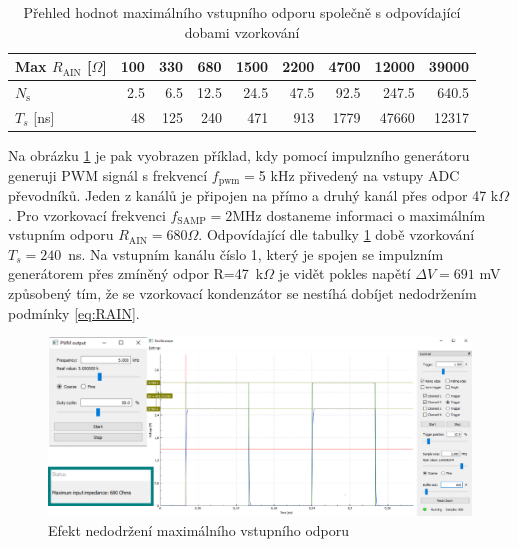 \begin{table}[H]
	\begin{tabular}{lrrrrrrrr}
		Max $R_{\text{AIN}}$ [$\Omega$]       & \multicolumn{1}{c}{100} & \multicolumn{1}{c}{330} & \multicolumn{1}{c}{680} & \multicolumn{1}{c}{1500} & \multicolumn{1}{c}{2200} & \multicolumn{1}{c}{4700} & \multicolumn{1}{c}{12000} & \multicolumn{1}{c}{39000} \\ \hline
		$N_{\text{s}}$ & 2.5                     & 6.5                     & 12.5                    & 24.5                     & 47.5                     & 92.5                     & 247.5                     & 640.5                     \\
		$T_s$ {[}ns{]}    & 48                      & 125                     & 240                     & 471                      & 913                      & 1779                     & 47660                     & 12317                    
	\end{tabular}
	\caption{Přehled hodnot maximálního vstupního odporu společně s odpovídající dobami vzorkování}
	\label{tab:maxRAIN}
\end{table}

 Na obrázku \ref{fig:wrongmaxrain} je pak vyobrazen příklad, kdy pomocí impulzního generátoru generuji PWM signál s frekvencí $f_{\text{pwm}}=$5 kHz přivedený na vstupy ADC převodníků. Jeden z kanálů je připojen na přímo a druhý kanál přes odpor 47 k$\Omega$. Pro vzorkovací frekvenci $f_{\text{SAMP}}=2$MHz dostaneme informaci o maximálním vstupním odporu $R_{\text{AIN}}=680\Omega$. Odpovídající dle tabulky \ref{tab:maxRAIN} době vzorkování $T_s=240$~ns. Na vstupním kanálu číslo 1, který je spojen se impulzním generátorem přes zmíněný odpor R=47~k$\Omega$ je vidět pokles napětí $\Delta V=691$ mV způsobený tím, že se vzorkovací kondenzátor se nestíhá dobíjet nedodržením podmínky \ref{eq:RAIN}.


\begin{figure}[H]
	\centering
	\includegraphics[width=0.9\linewidth]{Figs/Screenshots/RAINpwmgraph.pdf}
	\caption{Efekt nedodržení maximálního vstupního odporu}
	\label{fig:wrongmaxrain}
\end{figure}

